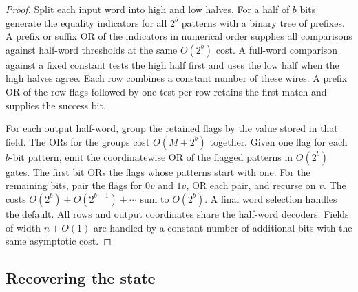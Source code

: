 \documentclass[11pt]{article}
\theoremstyle{definition}
\theoremstyle{remark}
\numberwithin{equation}{section}
\begin{document}
\begin{proof}
Split each input word into high and low halves. For a half of $b$ bits
generate the equality indicators for all $2^b$ patterns with a binary
tree of prefixes. A prefix or suffix OR of the indicators in numerical
order supplies all comparisons against half-word thresholds at the same
$O(2^b)$ cost. A full-word comparison against a fixed constant tests
the high half first and uses the low half when the high halves agree.
Each row combines a constant number of these wires. A prefix OR of the
row flags followed by one test per row retains the first match and
supplies the success bit.

For each output half-word, group the retained flags by the value stored
in that field. The ORs for the groups cost $O(M+2^b)$ together. Given
one flag for each $b$-bit pattern, emit the coordinatewise OR of the
flagged patterns in $O(2^b)$ gates. The first bit ORs the flags whose
patterns start with one. For the remaining bits, pair the flags for
$0v$ and $1v$, OR each pair, and recurse on $v$. The costs
$O(2^b)+O(2^{b-1})+\cdots$ sum to $O(2^b)$. A final word selection
handles the default. All rows and output coordinates share the
half-word decoders. Fields of width $n+O(1)$ are handled by a
constant number of additional bits with the same asymptotic cost.
\end{proof}

\subsection{Recovering the state}
\end{document}

